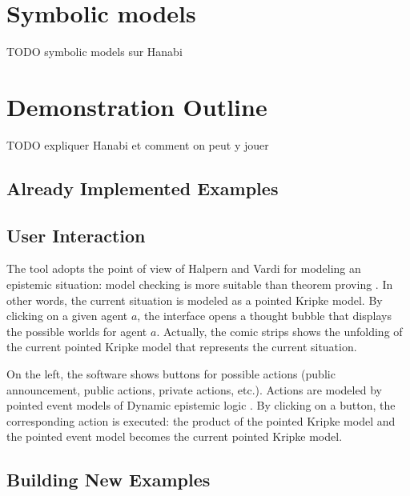 \documentclass{article}
\begin{document}
\section{Symbolic models}

TODO symbolic models sur Hanabi


\section{Demonstration Outline}
\label{section:demonstration}

TODO expliquer Hanabi et comment on peut y jouer


\subsection{Already Implemented Examples}




\subsection{User Interaction}

The tool adopts the point of view of Halpern and Vardi for modeling an epistemic situation: model checking is more suitable than theorem proving \cite{DBLP:conf/kr/HalpernV91}. In other words, the current situation is modeled as a pointed Kripke model.
By clicking on a given agent $a$, the interface opens a thought bubble that displays the possible worlds for agent $a$. Actually, the comic strips shows the unfolding of the current pointed Kripke model that represents the current situation.

On the left, the software shows buttons for possible actions (public announcement, public actions, private actions, etc.). Actions are modeled by pointed event models of Dynamic epistemic logic \cite{baltag1998logic}. By clicking on a button, the corresponding action is executed: the product of the pointed Kripke model and the pointed event model becomes the current pointed Kripke model.



\subsection{Building New Examples}
\end{document}
